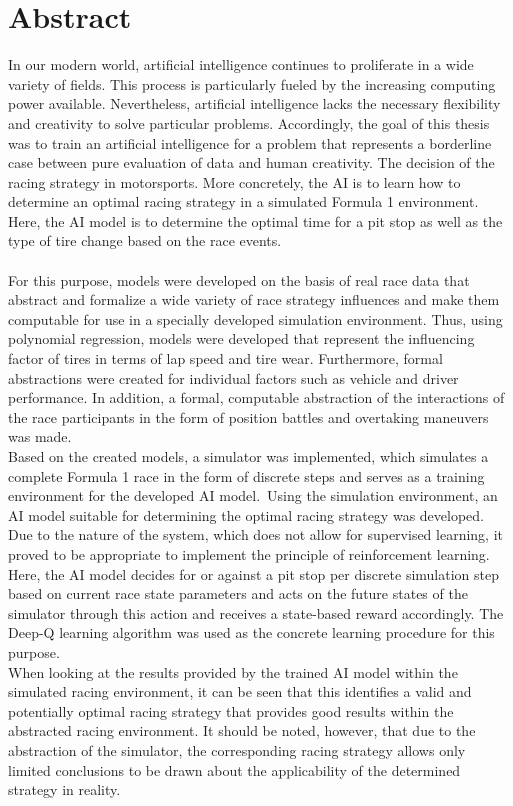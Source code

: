\section*{Abstract}
In our modern world, artificial intelligence continues to proliferate in a wide variety of fields. This process is particularly fueled by the increasing computing power available. Nevertheless, artificial intelligence lacks the necessary flexibility and creativity to solve particular problems. Accordingly, the goal of this thesis was to train an artificial intelligence for a problem that represents a borderline case between pure evaluation of data and human creativity. The decision of the racing strategy in motorsports.
More concretely, the AI is to learn how to determine an optimal racing strategy in a simulated Formula 1 environment. Here, the AI model is to determine the optimal time for a pit stop as well as the type of tire change based on the race events.\\\\
For this purpose, models were developed on the basis of real race data that abstract and formalize a wide variety of race strategy influences and make them computable for use in a specially developed simulation environment. Thus, using polynomial regression, models were developed that represent the influencing factor of tires in terms of lap speed and tire wear. Furthermore, formal abstractions were created for individual factors such as vehicle and driver performance. In addition, a formal, computable abstraction of the interactions of the race participants in the form of position battles and overtaking maneuvers was made.\\
Based on the created models, a simulator was implemented, which simulates a complete Formula 1 race in the form of discrete steps and serves as a training environment for the developed AI model.\
Using the simulation environment, an AI model suitable for determining the optimal racing strategy was developed. Due to the nature of the system, which does not allow for supervised learning, it proved to be appropriate to implement the principle of reinforcement learning. Here, the AI model decides for or against a pit stop per discrete simulation step based on current race state parameters and acts on the future states of the simulator through this action and receives a state-based reward accordingly. The Deep-Q learning algorithm was used as the concrete learning procedure for this purpose.\\
When looking at the results provided by the trained AI model within the simulated racing environment, it can be seen that this identifies a valid and potentially optimal racing strategy that provides good results within the abstracted racing environment.
It should be noted, however, that due to the abstraction of the simulator, the corresponding racing strategy allows only limited conclusions to be drawn about the applicability of the determined strategy in reality.

\newpage